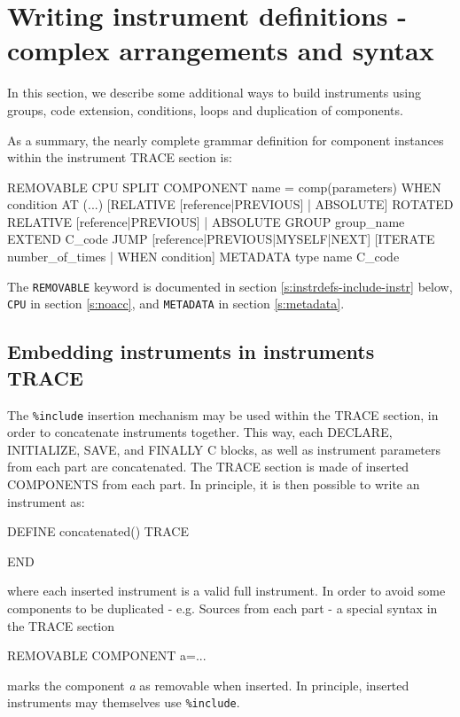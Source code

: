 \section{Writing instrument definitions - complex arrangements and syntax}
\label{s:instrdefs-extend}

In this section, we describe some additional ways to build instruments using
groups, code extension, conditions, loops and duplication of components.

As a summary, the nearly complete grammar definition for component instances
within the instrument TRACE section is:

\begin{mcstas}
{REMOVABLE} {CPU} {SPLIT} COMPONENT name = comp(parameters) {WHEN condition}
  AT (...) [RELATIVE [reference|PREVIOUS] | ABSOLUTE]
  {ROTATED {RELATIVE [reference|PREVIOUS] | ABSOLUTE} }
  {GROUP group_name}
  {EXTEND C_code}
  {JUMP [reference|PREVIOUS|MYSELF|NEXT] [ITERATE number_of_times | WHEN condition] }
  {METADATA type name C_code}
\end{mcstas}
The \texttt{REMOVABLE} keyword is documented in section
\ref{s:instrdefs-include-instr} below, \texttt{CPU} in section
\ref{s:noacc}, and \texttt{METADATA} in section \ref{s:metadata}.

\subsection{Embedding instruments in instruments TRACE}
\label{s:instrdefs-include-instr}
The \texttt{\%include} insertion mechanism may be used within the TRACE section,
in order to concatenate instruments together. This way, each DECLARE,
INITIALIZE, SAVE, and FINALLY C blocks, as well as instrument parameters from
each part are concatenated. The TRACE section is made of inserted COMPONENTS
from each part. In principle, it is then possible to write an instrument as:
\begin{mcstas}
DEFINE concatenated()
TRACE


END
\end{mcstas}
where each inserted instrument is a valid full instrument. In order to avoid
some components to be duplicated - e.g. Sources from each part - a special
syntax in the TRACE section
\begin{mcstas}
REMOVABLE COMPONENT a=...
\end{mcstas}
marks the component \textit{a} as removable when inserted. In principle, inserted
instruments may themselves use \texttt{\%include}.

